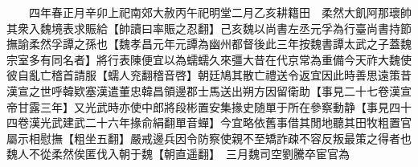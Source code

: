 　　四年春正月辛卯上祀南郊大赦丙午祀明堂二月乙亥耕籍田　柔然大飢阿那瓌帥其衆入魏境表求賑給【帥讀曰率賑之忍翻】己亥魏以尚書左丞元孚為行臺尚書持節撫諭柔然孚譚之孫也【魏孝昌元年元譚為幽州都督後此三年按魏書譚太武之子蓋魏宗室多有同名者】將行表陳便宜以為蠕蠕久來彊大昔在代京常為重備今天祚大魏使彼自亂亡稽首請服【蠕人兖翻稽音啓】朝廷鳩其散亡禮送令返宜因此時善思遠策昔漢宣之世呼韓欵塞漢遣董忠韓昌領邊郡士馬送出朔方因留衛助【事見二十七卷漢宣帝甘露三年】又光武時亦使中郎將段彬置安集掾史随單于所在參察動静【事見四十四卷漢光武建武二十六年掾俞絹翻單音蟬】今宜略依舊事借其閒地聽其田牧粗置官屬示相慰撫【粗坐五翻】嚴戒邊兵因令防察使親不至矯詐疎不容反叛最策之得者也魏人不從柔然俟匿伐入朝于魏【朝直遥翻】　三月魏司空劉騰卒宦官為